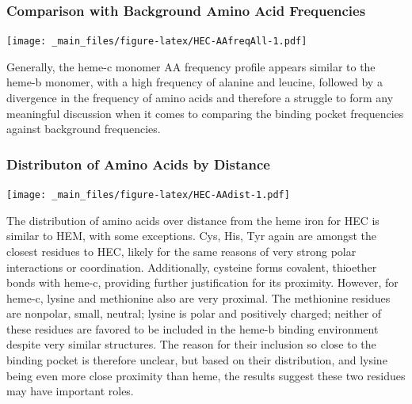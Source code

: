\documentclass[a4paper, nobind]{templates/ociamthesis}
\let\origfigure\figure
\let\endorigfigure\endfigure
\renewenvironment{figure}[1][2] {
    \expandafter\origfigure\expandafter[H]
} {
    \endorigfigure
}
\begin{document}
\hypertarget{comparison-with-background-amino-acid-frequencies-1}{%
\subsubsection{Comparison with Background Amino Acid Frequencies}\label{comparison-with-background-amino-acid-frequencies-1}}

\begin{figure}
\centering
\texttt{[image: \_main\_files/figure-latex/HEC-AAfreqAll-1.pdf]}
\caption{\label{fig:HEC-AAfreqAll}HEC: AA Frequency of Monomer}
\end{figure}

Generally, the heme-c monomer AA frequency profile appears similar to the heme-b monomer, with a high frequency of alanine and leucine, followed by a divergence in the frequency of amino acids and therefore a struggle to form any meaningful discussion when it comes to comparing the binding pocket frequencies against background frequencies.

\hypertarget{distributon-of-amino-acids-by-distance-1}{%
\subsubsection{Distributon of Amino Acids by Distance}\label{distributon-of-amino-acids-by-distance-1}}

\begin{figure}
\centering
\texttt{[image: \_main\_files/figure-latex/HEC-AAdist-1.pdf]}
\caption{\label{fig:HEC-AAdist}HEC: Residue Distribution by Distance}
\end{figure}

The distribution of amino acids over distance from the heme iron for HEC is similar to HEM, with some exceptions. Cys, His, Tyr again are amongst the closest residues to HEC, likely for the same reasons of very strong polar interactions or coordination. Additionally, cysteine forms covalent, thioether bonds with heme-c, providing further justification for its proximity. However, for heme-c, lysine and methionine also are very proximal. The methionine residues are nonpolar, small, neutral; lysine is polar and positively charged; neither of these residues are favored to be included in the heme-b binding environment despite very similar structures. The reason for their inclusion so close to the binding pocket is therefore unclear, but based on their distribution, and lysine being even more close proximity than heme, the results suggest these two residues may have important roles.
\end{document}
